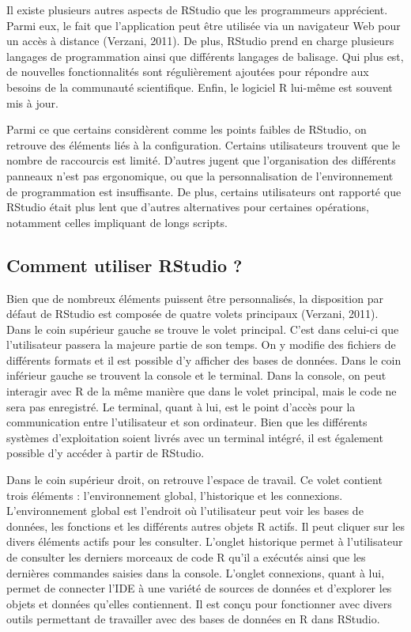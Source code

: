 \documentclass[
  letterpaper,
  DIV=11,
  numbers=noendperiod]{scrreprt}
\begin{document}
Il existe plusieurs autres aspects de RStudio que les programmeurs
apprécient. Parmi eux, le fait que l'application peut être utilisée via
un navigateur Web pour un accès à distance (Verzani, 2011). De plus,
RStudio prend en charge plusieurs langages de programmation ainsi que
différents langages de balisage. Qui plus est, de nouvelles
fonctionnalités sont régulièrement ajoutées pour répondre aux besoins de
la communauté scientifique. Enfin, le logiciel R lui-même est souvent
mis à jour.

Parmi ce que certains considèrent comme les points faibles de RStudio,
on retrouve des éléments liés à la configuration. Certains utilisateurs
trouvent que le nombre de raccourcis est limité. D'autres jugent que
l'organisation des différents panneaux n'est pas ergonomique, ou que la
personnalisation de l'environnement de programmation est insuffisante.
De plus, certains utilisateurs ont rapporté que RStudio était plus lent
que d'autres alternatives pour certaines opérations, notamment celles
impliquant de longs scripts.

\subsection{Comment utiliser RStudio ?}\label{comment-utiliser-rstudio}

Bien que de nombreux éléments puissent être personnalisés, la
disposition par défaut de RStudio est composée de quatre volets
principaux (Verzani, 2011). Dans le coin supérieur gauche se trouve le
volet principal. C'est dans celui-ci que l'utilisateur passera la
majeure partie de son temps. On y modifie des fichiers de différents
formats et il est possible d'y afficher des bases de données. Dans le
coin inférieur gauche se trouvent la console et le terminal. Dans la
console, on peut interagir avec R de la même manière que dans le volet
principal, mais le code ne sera pas enregistré. Le terminal, quant à
lui, est le point d'accès pour la communication entre l'utilisateur et
son ordinateur. Bien que les différents systèmes d'exploitation soient
livrés avec un terminal intégré, il est également possible d'y accéder à
partir de RStudio.

Dans le coin supérieur droit, on retrouve l'espace de travail. Ce volet
contient trois éléments : l'environnement global, l'historique et les
connexions. L'environnement global est l'endroit où l'utilisateur peut
voir les bases de données, les fonctions et les différents autres objets
R actifs. Il peut cliquer sur les divers éléments actifs pour les
consulter. L'onglet historique permet à l'utilisateur de consulter les
derniers morceaux de code R qu'il a exécutés ainsi que les dernières
commandes saisies dans la console. L'onglet connexions, quant à lui,
permet de connecter l'IDE à une variété de sources de données et
d'explorer les objets et données qu'elles contiennent. Il est conçu pour
fonctionner avec divers outils permettant de travailler avec des bases
de données en R dans RStudio.
\end{document}
